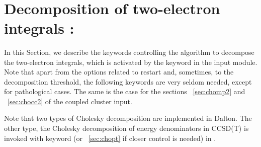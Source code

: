 ~%
\section{Decomposition of two-electron integrals : }\label{sec:choles}
%
%
%

In this Section, we describe the keywords controlling the algorithm to 
decompose the two-electron integrals, which is activated by the 
keyword  in the  input module.
Note that apart from
the options related to restart and, sometimes, to the decomposition
threshold, the following keywords are very seldom needed,
except for pathological cases. The same is the case for the sections
~\ref{sec:chomp2} and ~\ref{sec:chocc2} 
of the coupled cluster input.

Note that two types of Cholesky decomposition are implemented in Dalton.
The other type, the Cholesky decomposition of energy denominators in CCSD(T)  is
invoked with keyword  (or ~\ref{sec:chopt} if 
closer control is needed) in .


\begin{center}
\end{center}

